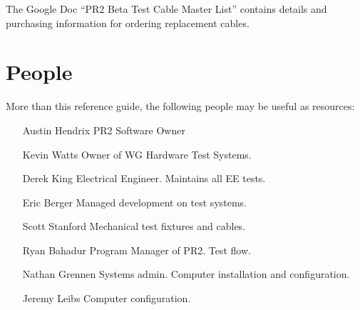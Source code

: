 \documentclass[11pt]{report}
\begin{document}
The Google Doc ``PR2 Beta Test Cable Master List'' contains details and purchasing information for ordering replacement cables.


\chapter {People}

More than this reference guide, the following people may be useful as resources:
\begin{itemize}
\item [Austin Hendrix] PR2 Software Owner
\item [Kevin Watts] Owner of WG Hardware Test Systems.
\item [Derek King] Electrical Engineer. Maintains all EE tests.
\item [Eric Berger] Managed development on test systems.
\item [Scott Stanford] Mechanical test fixtures and cables.
\item [Ryan Bahadur] Program Manager of PR2. Test flow.
\item [Nathan Grennen] Systems admin. Computer installation and configuration.
\item [Jeremy Leibs] Computer configuration.
\end{itemize}
\end{document}
